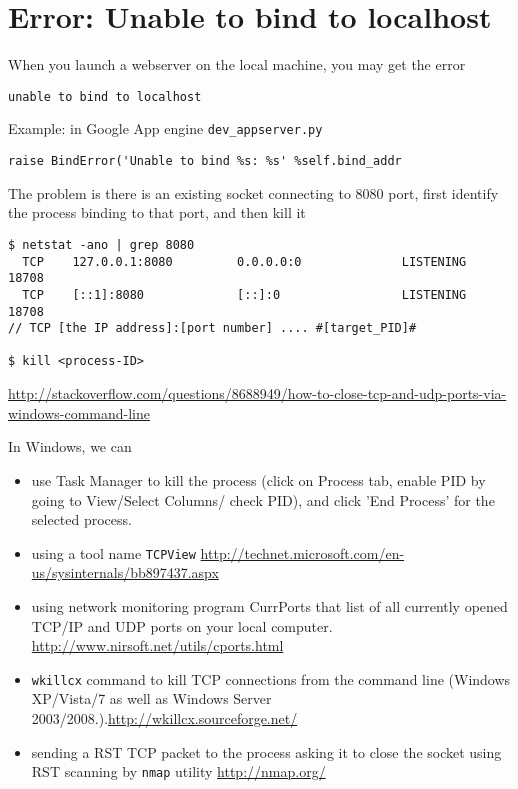 \section{Error: Unable to bind to localhost}


When you launch a webserver on the local machine, you may get the error
\begin{verbatim}
unable to bind to localhost
\end{verbatim}

Example: in Google App engine \verb!dev_appserver.py!
\begin{verbatim}
raise BindError('Unable to bind %s: %s' %self.bind_addr
\end{verbatim}


The problem is there is an existing socket connecting to 8080 port, first
identify the process binding to that port, and then kill it
\begin{verbatim}
$ netstat -ano | grep 8080
  TCP    127.0.0.1:8080         0.0.0.0:0              LISTENING       18708
  TCP    [::1]:8080             [::]:0                 LISTENING       18708
// TCP [the IP address]:[port number] .... #[target_PID]#

$ kill <process-ID>
\end{verbatim}
\url{http://stackoverflow.com/questions/8688949/how-to-close-tcp-and-udp-ports-via-windows-command-line}

In Windows, we can 
\begin{itemize}
  \item use Task Manager to kill the process (click on Process  tab,
enable PID by going to View/Select Columns/ check PID), and click 'End Process'
for the selected process.

  \item using a tool name \verb!TCPView! 
  \url{http://technet.microsoft.com/en-us/sysinternals/bb897437.aspx}
  
  \item using network monitoring program CurrPorts that 
  list of all currently opened TCP/IP and UDP ports on your local computer.
  \url{http://www.nirsoft.net/utils/cports.html}
  
  \item \verb!wkillcx! command to kill TCP connections from the command
  line (Windows XP/Vista/7 as well as Windows Server
  2003/2008.).\url{http://wkillcx.sourceforge.net/}
  
  \item sending a RST TCP packet  to the process asking it to close the  socket
  using  RST scanning by \verb!nmap! utility \url{http://nmap.org/}
  
  
\end{itemize}

